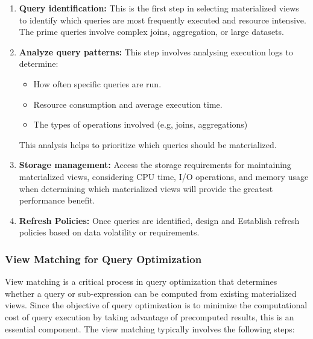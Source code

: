 \begin{enumerate}[label=\alph*)]
    \item \textbf{Query identification:} This is the first step in selecting materialized views to identify which queries are most frequently executed and resource intensive. The prime queries involve complex joins, aggregation, or large datasets.
    
    \item \textbf{Analyze query patterns:} This step involves analysing execution logs to determine:
    
     \begin{itemize}
          \item How often specific queries are run.
          \item Resource consumption and average execution time.
          \item The types of operations involved (e.g, joins, aggregations)
      \end{itemize}
      This analysis helps to prioritize which queries should be materialized.
      
    \item \textbf{Storage management:} Access the storage requirements for maintaining materialized views, considering CPU time, I/O operations, and memory usage when determining which materialized views will provide the greatest performance benefit.
    
    \item \textbf{Refresh Policies:} Once queries are identified, design and  Establish refresh policies based on data volatility or requirements.
\end{enumerate}
\subsubsection{View Matching for Query Optimization }

View matching is a critical process in query optimization that determines whether a query or sub-expression can be computed from existing materialized views. Since the objective of query optimization is to minimize the computational cost of query execution by taking advantage of precomputed results, this is an essential component. The view matching typically involves the following steps:\vspace{.4cm}


